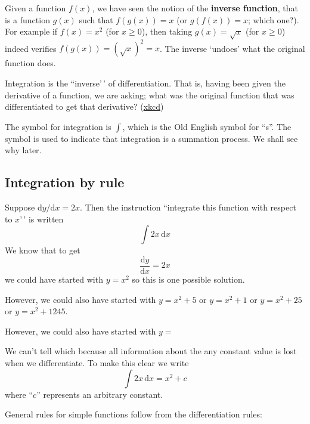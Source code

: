 \documentclass[
  11pt,
  oneside]{book}
\newcommand{\slide}{}
\theoremstyle{definition}
\theoremstyle{definition}
\theoremstyle{definition}
\theoremstyle{definition}
\theoremstyle{remark}
\begin{document}
Given a function \(f(x)\), we have seen the notion of the \textbf{inverse function}, that is a function \(g(x)\) such that \(f(g(x)) = x\) (or \(g(f(x))=x\); which one?). For example if \(f(x) = x^2\) (for \(x\geq0\)), then taking \(g(x) = \sqrt{x}\) (for \(x\geq0\)) indeed verifies \(f(g(x)) = (\sqrt{x})^2 = x\). The inverse `undoes' what the original function does.

Integration is the ``inverse'\,' of differentiation. That is, having been given the derivative of a function, we are asking; what was the original function that was differentiated to get that derivative? (\href{https://xkcd.com/2117/}{xkcd})

The symbol for integration is \(\displaystyle\int\), which is the Old English symbol for ``s''. The symbol is used to indicate that integration is a summation process. We shall see why later.

\slide

\subsection{Integration by rule}\label{integration-by-rule}

Suppose \(\mathrm{d}y/\mathrm{d} x = 2x\). Then the instruction ``integrate this function with respect to \(x\)'\,' is written
\[
\int 2x \,\mathrm{d}x
\]
We know that to get
\[
\frac{\mathrm{d}y}{\mathrm{d}x} = 2x
\]
we could have started with \(y = x^2\) so this is one possible solution.

\begin{notslides}

However, we could also have started with \(y = x^2 + 5\) or \(y = x^2 + 1\) or \(y = x^2 + 25\) or \(y = x^2 + 1245\).

\end{notslides}

\begin{slidesonly}

However, we could also have started with \(y =\)
\slide

\end{slidesonly}

We can't tell which because all information about the any constant value is lost when we differentiate. To make this clear we write
\[
\int 2x \,\mathrm{d}x = x^2 + c
\]
where ``\(c\)'' represents an arbitrary constant.

\slide

General rules for simple functions follow from the differentiation rules:
\end{document}
